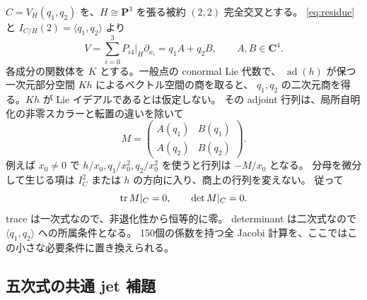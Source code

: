 \documentclass[11pt,a4paper]{ltjsarticle}
\newcommand{\CC}{\mathbf C}\newcommand{\QQ}{\mathbf Q}
\newcommand{\PP}{\mathbf P}\renewcommand{\AA}{\mathbf A}
\theoremstyle{remark}\newtheorem{remark}[theorem]{注意}
\begin{document}
$C=V_H(q_1,q_2)$ を、$H\cong\PP^3$ を張る被約 $(2,2)$ 完全交叉とする。
\eqref{eq:residue}と $I_{C/H}(2)=\langle q_1,q_2\rangle$ より
\[
V=\sum_{i=0}^3 P_{i4}|_H\partial_{x_i}=q_1A+q_2B,
\qquad A,B\in\CC^4.
\]
各成分の関数体を $K$ とする。一般点の conormal Lie 代数で、
$\operatorname{ad}(h)$ が保つ一次元部分空間 $Kh$ によるベクトル空間の商を取ると、
$q_1,q_2$ の二次元商を得る。$Kh$ が Lie イデアルであるとは仮定しない。
その adjoint 行列は、局所自明化の非零スカラーと転置の違いを除いて
\begin{equation}\label{eq:matrixM}
M=\begin{pmatrix}A(q_1)&B(q_1)\\ A(q_2)&B(q_2)\end{pmatrix}.
\end{equation}
例えば $x_0\ne0$ で $h/x_0,q_1/x_0^2,q_2/x_0^2$ を使うと行列は $-M/x_0$ となる。
分母を微分して生じる項は $I_C^2$ または $h$ の方向に入り、商上の行列を変えない。
従って
\begin{equation}\label{eq:nilpotency}
\operatorname{tr} M|_C=0,\qquad \det M|_C=0.
\end{equation}
trace は一次式なので、非退化性から恒等的に零。
determinant は二次式なので $\langle q_1,q_2\rangle$ への所属条件となる。
150個の係数を持つ全 Jacobi 計算を、ここではこの小さな必要条件に置き換えられる。

\subsection{五次式の共通 jet 補題}
\end{document}
